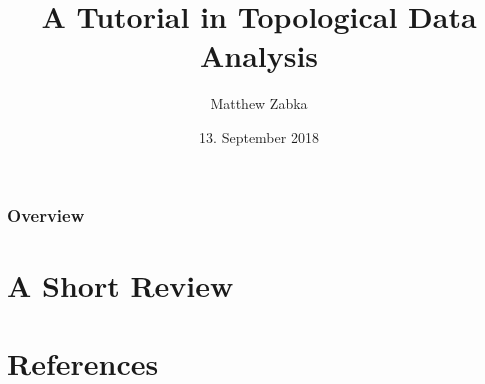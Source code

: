\documentclass[handout]{beamer}
\title{A Tutorial in Topological Data Analysis} %
\author{Matthew Zabka}
\institute[SMSU] %
{
}
\date{13. September 2018} %
\begin{document}
\begin{frame}
\titlepage %
\end{frame}
\begin{frame}
\frametitle{Overview} %
\tableofcontents 
\end{frame}
\section{A Short Review}

\section{References}
\begin{frame}


\end{frame}
\end{document}
